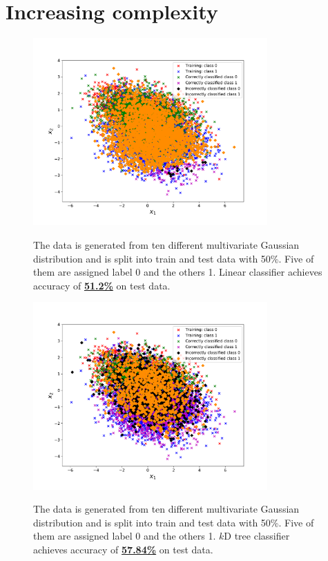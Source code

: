 \documentclass{article}
\begin{document}
\newpage
\section{Increasing complexity}
\begin{figure}[htbp]
\centering
{\includegraphics[width=0.8\textwidth]{figures/linear_classifier_5.pdf}}
\caption{The data is generated from ten different multivariate Gaussian distribution and is split into train and test data with 50\%. Five of them are assigned label 0 and the others 1. Linear classifier achieves accuracy of \underline{\textbf{51.2\%}} on test data.}
\label{fig:lin_classifier_5}
\end{figure}

\begin{figure}[htbp]
\centering
{\includegraphics[width=0.8\textwidth]{figures/kdtree_classifier_5.pdf}}
\caption{The data is generated from ten different multivariate Gaussian distribution and is split into train and test data with 50\%. Five of them are assigned label 0 and the others 1. $k$D tree classifier achieves accuracy of \underline{\textbf{57.84\%}} on test data.}
\label{fig:kdtree_classifier_5}
\end{figure}
\end{document}
